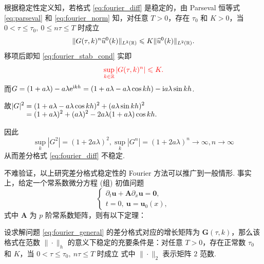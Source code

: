 \noindent{} 根据稳定性定义知，若格式 \eqref{eq:fourier_diff} 是稳定的，由 Parseval 恒等式 \eqref{eq:parseval} 和 \eqref{eq:fourier_norm} 知，对任意 $T > 0$，存在 $\tau_0$ 和 $K > 0$，当 $0 < \tau \leq \tau_0, \ 0 \leq n\tau \leq T$ 时成立
\begin{equation}
    \|G(\tau, k)^n \widehat{u}^0(k)\|_{L^2(\mathbb{R})} \leqslant K \|\widehat{u}^0(k)\|_{L^2(\mathbb{R})}. \label{eq:fourier_stab_cond}
\end{equation}
移项后即知 \eqref{eq:fourier_stab_cond} 实即
\begin{equation}
    {\color{red} \sup_{k \in \mathbb{R}} |G(\tau, k)^n| \leqslant K.} 
\end{equation}
而$G=(1+a\lambda)-a\lambda\mathrm{e}^{\mathrm{i} kh}=(1+a\lambda-a\lambda\cos kh)-\mathrm{i} a\lambda\sin kh$.\par
故$\setjot[-2]\begin{aligned}[t]
        |G|^2 &= (1 + a\lambda - a\lambda \cos kh)^2 + (a\lambda \sin kh)^2 \\
        &= (1 + a\lambda)^2 + (a\lambda)^2 - 2a\lambda(1 + a\lambda)\cos kh.
\end{aligned}$\par
因此\[\sup_{k}|G^2|=(1+2a\lambda)^2,\sup_k|G^n|=(1+2a\lambda)^n\to\infty,n\to\infty\]
从而差分格式 \eqref{eq:fourier_diff} 不稳定.\par

不难验证，以上研究差分格式稳定性的 Fourier 方法可以推广到一般情形. 事实上，给定一个常系数微分方程 (组) 初值问题
\begin{equation}
    \begin{cases}
        \partial_t \bm{u} + \bm{A} \partial_x \bm{u} = \bm{0}, \\
        t = 0, \ \bm{u} = \bm{u}_0(x),
    \end{cases} \label{eq:fourier_general}
\end{equation}
式中 $\bm{A}$ 为 $p$ 阶常系数矩阵，则有以下定理：

\begin{theorem}
    设求解问题 \eqref{eq:fourier_general} 的差分格式对应的增长矩阵为 $\bm{G}(\tau, k)$，那么该格式在范数 $\|\cdot\|_h$ 的意义下稳定的充要条件是：{对任意 $T > 0$，存在正常数 $\tau_0$ 和 $K$，当 $0 < \tau \leq \tau_0, \ n\tau \leq T$ 时成立}
    {式中 $\|\cdot\|_2$ 表示矩阵 $2$ 范数.}
\end{theorem}

